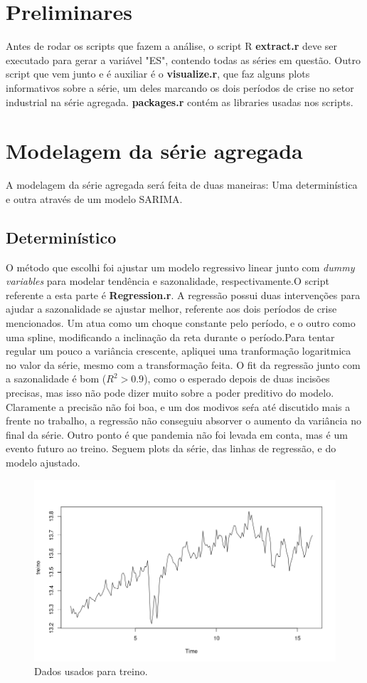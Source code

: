\documentclass[10pt,a4paper]{article}
\begin{document}
\section{Preliminares}
Antes de rodar os scripts que fazem a análise, o script R \textbf{extract.r} deve ser executado para gerar a variável "ES", contendo todas as séries em questão. Outro script que vem junto e é auxiliar é o \textbf{visualize.r}, que faz alguns plots informativos sobre a série, um deles marcando os dois períodos de crise no setor industrial na série agregada. \textbf{packages.r} contém as libraries usadas nos scripts.
\section{Modelagem da série agregada}

A modelagem da série agregada será feita de duas maneiras: Uma determinística e outra através de um modelo SARIMA.

\subsection{Determinístico}

O método que escolhi foi ajustar um modelo regressivo linear junto com \textit{dummy variables} para modelar tendência e sazonalidade, respectivamente.O script referente a esta parte é \textbf{Regression.r}. A regressão possui duas intervenções para ajudar a sazonalidade se ajustar melhor, referente aos dois períodos de crise mencionados. Um atua como um choque constante pelo período, e o outro como uma spline, modificando a inclinação da reta durante o período.Para tentar regular um pouco a variância crescente, apliquei uma tranformação logaritmica no valor da série, mesmo com a transformação feita. O fit da regressão junto com a sazonalidade é bom ($R^2 > 0.9$), como o esperado depois de duas incisões precisas, mas isso não pode dizer muito sobre a poder preditivo do modelo. Claramente a precisão não foi boa, e um dos modivos seŕa até discutido mais a frente no trabalho, a regressão não conseguiu absorver o aumento da variância no final da série. Outro ponto é que pandemia não foi levada em conta, mas é um evento futuro ao treino. Seguem plots da série, das linhas de regressão, e do modelo ajustado. \newpage

\begin{figure}[h]
\centering
\includegraphics[width=.8 \linewidth]{../regressao_pura.png} 
\caption{Dados usados para treino.}
\end{figure}
\end{document}
